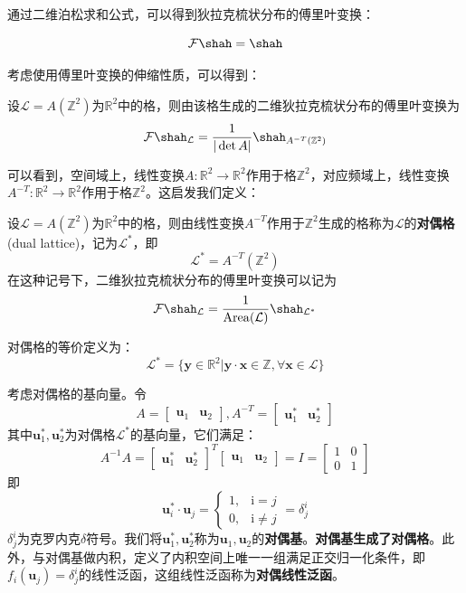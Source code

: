 通过二维泊松求和公式，可以得到狄拉克梳状分布的傅里叶变换：
\begin{proposition}[二维狄拉克梳状分布的傅里叶变换]
    \[\mathcal{F} \shah=\shah\]
\end{proposition}

考虑使用傅里叶变换的伸缩性质，可以得到：
\begin{proposition}
    设$\mathcal{L} =A(\mathbb{Z}^2)$为$\mathbb{R}^2$中的格，则由该格生成的二维狄拉克梳状分布的傅里叶变换为
    \[\mathcal{F} \shah_{\mathcal{L} }=\frac{1}{|\det A|}\shah_{A^{-T}(\mathbb{Z}^2)}\]
\end{proposition}

可以看到，空间域上，线性变换$A:\mathbb{R}^2\to\mathbb{R}^2$作用于格$\mathbb{Z}^2$，对应频域上，线性变换$A^{-T}:\mathbb{R}^2\to\mathbb{R}^2$作用于格$\mathbb{Z}^2$。这启发我们定义：
\begin{definition}[对偶格]
    设$\mathcal{L} =A(\mathbb{Z}^2)$为$\mathbb{R}^2$中的格，则由线性变换$A^{-T}$作用于$\mathbb{Z}^2$生成的格称为$\mathcal{L} $的\textbf{对偶格}(dual lattice)，记为$\mathcal{L} ^*$，即
    \[\mathcal{L} ^*=A^{-T}(\mathbb{Z}^2)\]
    在这种记号下，二维狄拉克梳状分布的傅里叶变换可以记为
    \[\mathcal{F} \shah_{\mathcal{L} }=\frac{1}{\mathrm{Area}(\mathcal{L} )}\shah_{\mathcal{L} ^*}\]

    对偶格的等价定义为：
    \[\mathcal{L} ^*=\{\mathbf{y}\in\mathbb{R}^2\left|\mathbf{y}\cdot \mathbf{x}\in\mathbb{Z},\forall \mathbf{x}\in\mathcal{L}\right. \}\]
\end{definition}
\begin{definition}[对偶基与对偶线性泛函]
    考虑对偶格的基向量。令
    \[A=\begin{bmatrix}
        \mathbf{u}_1&\mathbf{u}_2
    \end{bmatrix},A^{-T}=\begin{bmatrix}
        \mathbf{u}^*_1&\mathbf{u}^*_2
    \end{bmatrix}\]
    其中$\mathbf{u}^*_1,\mathbf{u}^*_2$为对偶格$\mathcal{L} ^*$的基向量，它们满足：
    \[A^{-1}A=\begin{bmatrix}
        \mathbf{u}^*_1&\mathbf{u}^*_2
    \end{bmatrix}^T\begin{bmatrix}
        \mathbf{u}_1&\mathbf{u}_2
    \end{bmatrix}=I=\begin{bmatrix}
        1&0\\
        0&1
    \end{bmatrix}\]
    即\[\mathbf{u}^*_i\cdot \mathbf{u}_j=\begin{cases}
    1,&\mathrm{i}=j\\
    0,&\mathrm{i}\neq j
    \end{cases}=\delta^i_{j}\]
    $\delta^i_{j}$为克罗内克$\delta$符号。我们将$\mathbf{u}^*_1,\mathbf{u}^*_2$称为$\mathbf{u}_1,\mathbf{u}_2$的\textbf{对偶基}。\textbf{对偶基生成了对偶格}。此外，与对偶基做内积，定义了内积空间上唯一一组满足正交归一化条件，即$f_i(\mathbf{u}_j)=\delta^i_{j}$的线性泛函，这组线性泛函称为\textbf{对偶线性泛函}。
\end{definition}

